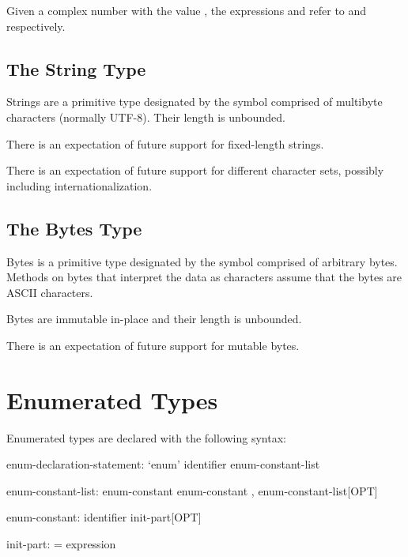 \begin{example}
Given a complex number  with the value , the
expressions  and  refer to 
and  respectively.
\end{example}

\subsection{The String Type}
\label{The_String_Type}

Strings are a primitive type designated by the symbol 
comprised of multibyte characters (normally UTF-8).  Their length is unbounded.


\begin{openissue}
There is an expectation of future support for fixed-length strings.
\end{openissue}

\begin{openissue}
There is an expectation of future support for different character
sets, possibly including internationalization.
\end{openissue}

\subsection{The Bytes Type}
\label{The_Bytes_Type}

Bytes is a primitive type designated by the symbol  comprised of
arbitrary bytes. Methods on bytes that interpret the data as characters assume
that the bytes are ASCII characters.
    
Bytes are immutable in-place and their length is unbounded.


\begin{openissue}
There is an expectation of future support for mutable bytes.
\end{openissue}

\section{Enumerated Types}
\label{Enumerated_Types}

Enumerated types are declared with the following syntax:

\begin{syntax}
enum-declaration-statement:
  `enum' identifier { enum-constant-list }

enum-constant-list:
  enum-constant
  enum-constant , enum-constant-list[OPT]

enum-constant:
  identifier init-part[OPT]

init-part:
  = expression
\end{syntax}

